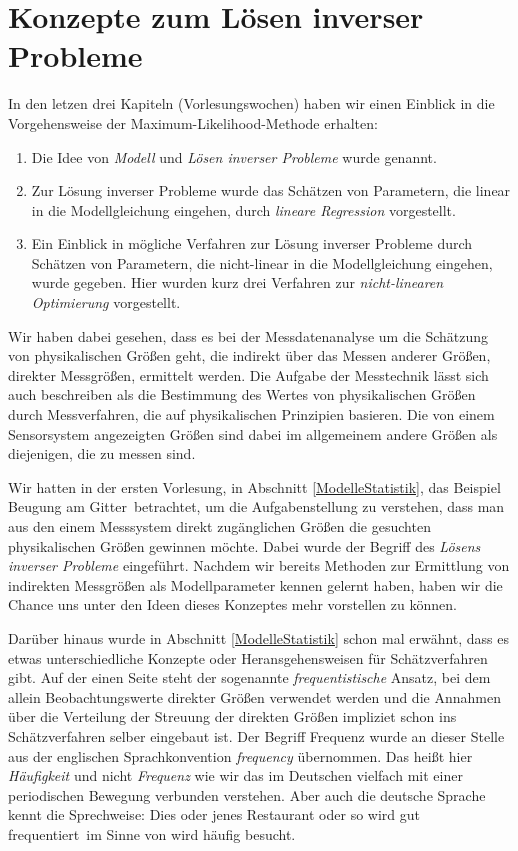 \label{KonzepteinverseProbleme}

\section{Konzepte zum Lösen inverser Probleme}

In den letzen drei Kapiteln (Vorlesungswochen) haben wir einen Einblick in die
Vorgehensweise der Maximum-Likelihood-Methode erhalten:
\begin{enumerate}
\item Die Idee von \textsl{Modell} und \textsl{Lösen inverser Probleme} wurde
  genannt.
\item Zur Lösung inverser Probleme wurde das Schätzen von Parametern, die
 linear in die Modellgleichung eingehen, durch \textsl{lineare Regression} vorgestellt.
\item Ein Einblick in mögliche Verfahren zur Lösung inverser Probleme durch
  Schätzen von Parametern, die nicht-linear in die Modellgleichung eingehen,
  wurde gegeben. Hier wurden kurz drei Verfahren zur \textsl{nicht-linearen Optimierung}
  vorgestellt.
\end{enumerate}
Wir haben dabei gesehen, dass es bei der Messdatenanalyse um die Schätzung von
physikalischen Größen geht, die indirekt über das Messen anderer Größen,
direkter Messgrößen, ermittelt werden.
Die Aufgabe der Messtechnik lässt sich auch beschreiben als die Bestimmung
des Wertes von physikalischen Größen durch Messverfahren, die auf
physikalischen Prinzipien basieren. Die von einem Sensorsystem angezeigten
Größen sind dabei im allgemeinem andere Größen als diejenigen, die zu messen sind.

Wir hatten in der ersten Vorlesung, in Abschnitt \ref{ModelleStatistik},
das Beispiel \glqq Beugung am Gitter\grqq ~betrachtet,
um die Aufgabenstellung zu verstehen, dass man
aus den einem Messsystem direkt zugänglichen Größen die gesuchten physikalischen
Größen gewinnen möchte. Dabei wurde der Begriff des \textsl{Lösens inverser Probleme}
eingeführt. Nachdem wir bereits Methoden zur Ermittlung von indirekten
Messgrößen als Modellparameter kennen gelernt haben, haben wir die Chance uns
unter den Ideen dieses Konzeptes mehr vorstellen zu können.

Darüber hinaus wurde in Abschnitt \ref{ModelleStatistik} schon mal erwähnt, dass
es etwas unterschiedliche Konzepte oder Heransgehensweisen für Schätzverfahren gibt.
Auf der einen Seite steht der sogenannte \textsl{frequentistische} Ansatz, bei dem allein
Beobachtungswerte direkter Größen verwendet werden und die Annahmen über die
Verteilung der Streuung der direkten Größen impliziet schon ins Schätzverfahren
selber eingebaut ist. Der Begriff Frequenz wurde an dieser Stelle aus der
englischen Sprachkonvention \textsl{frequency} übernommen. Das
heißt hier \textsl{Häufigkeit} und nicht \textsl{Frequenz} wie wir das im Deutschen
vielfach mit einer periodischen Bewegung verbunden verstehen. Aber auch die
deutsche Sprache kennt die Sprechweise: \glqq Dies oder jenes Restaurant oder so
wird gut frequentiert\grqq ~im Sinne von \glqq wird häufig besucht\grqq.

